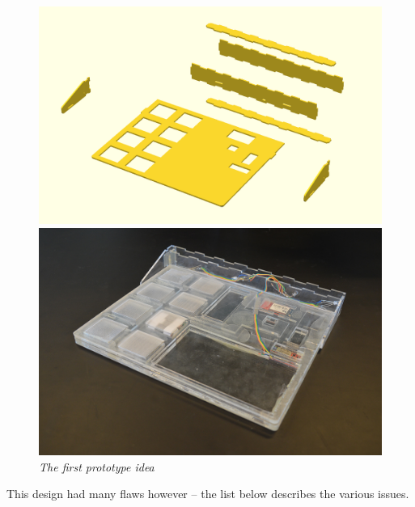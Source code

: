 \begin{figure}[h]
\setlength{\belowcaptionskip}{-5mm}
\begin{minipage}[b]{.5\textwidth}
\includegraphics[width=1.05\textwidth]{figures/iterations/v1.png}
\end{minipage}
\begin{minipage}[b]{.5\textwidth}
\includegraphics[width=1\textwidth]{figures/iterations/v1-photo.jpg}
\end{minipage}
\caption{\small {\it {The first prototype idea}}} 
\label{fig:v1}
\end{figure}

This design had many flaws however -- the list below describes the various issues.


